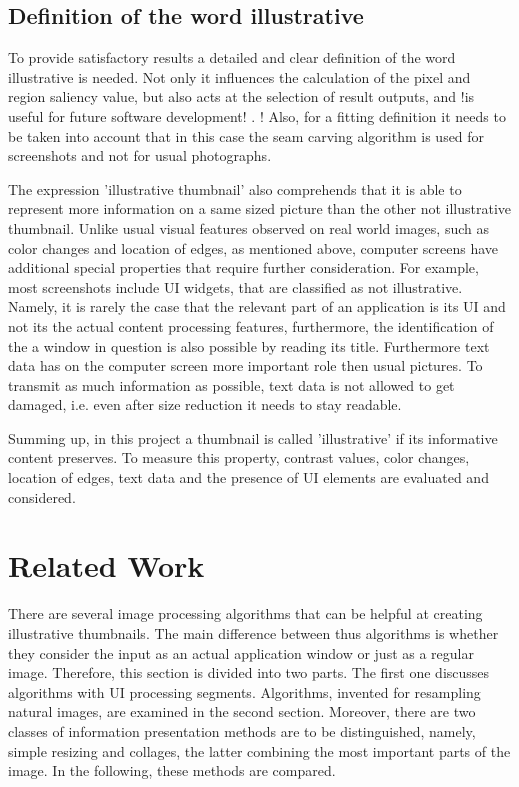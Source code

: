 \documentclass[draft,final]{vutinfth} %
\begin{document}
\section{Definition of the word illustrative} 
To provide satisfactory results a detailed and clear definition of the word illustrative is needed.
Not only it influences the calculation of the pixel and region saliency value, but also acts at the selection of result outputs, and !is useful for future software development! .
! Also, for a fitting definition it needs to be taken into account that in this case the seam carving algorithm is used for screenshots and not for usual photographs.\par 
The expression 'illustrative thumbnail' also comprehends that it is able to represent more information on a same sized picture than the other not illustrative thumbnail.
Unlike usual visual features observed on real world images, such as color changes and location of edges, as mentioned above, computer screens have additional special properties that require further consideration.
For example, most screenshots include UI widgets, that are classified as not illustrative.
Namely, it is rarely the case that the relevant part of an application is its UI and not its the actual content processing features, furthermore, the identification of the a window in question is also possible by reading its title.
Furthermore text data has on the computer screen more important role then usual pictures.
To transmit as much information as possible, text data is not allowed to get damaged, i.e. even after size reduction it needs to stay readable.\par 
Summing up, in this project a thumbnail is called 'illustrative' if its informative content preserves.
To measure this property, contrast values, color changes, location of edges, text data and the presence of UI elements are evaluated and considered.            

\chapter{Related Work}
There are several image processing algorithms that can be helpful at creating illustrative thumbnails.
The main difference between thus algorithms is whether they consider the input as an actual application window or just as a regular image.
Therefore, this section is divided into two parts.
The first one discusses algorithms with UI processing segments.
Algorithms, invented for resampling natural images, are examined in the second section. 
Moreover, there are two classes of information presentation methods are to be distinguished, namely, simple resizing and collages, the latter combining the most important parts of the image. 
In the following, these methods are compared.
\end{document}
